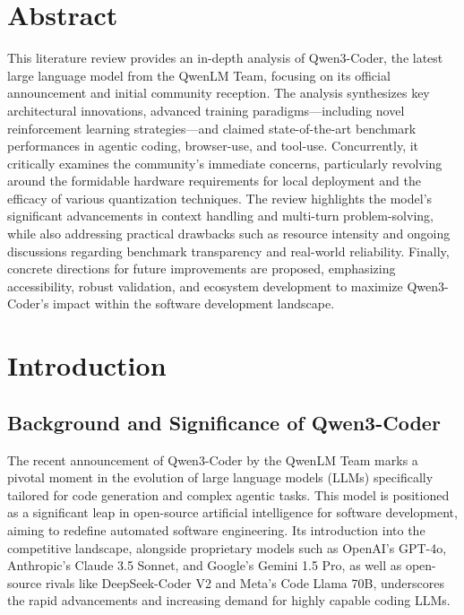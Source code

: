 




\section*{Abstract}

This literature review provides an in-depth analysis of Qwen3-Coder, the latest large language model from the QwenLM Team, focusing on its official announcement and initial community reception. The analysis synthesizes key architectural innovations, advanced training paradigms—including novel reinforcement learning strategies—and claimed state-of-the-art benchmark performances in agentic coding, browser-use, and tool-use. Concurrently, it critically examines the community's immediate concerns, particularly revolving around the formidable hardware requirements for local deployment and the efficacy of various quantization techniques. The review highlights the model's significant advancements in context handling and multi-turn problem-solving, while also addressing practical drawbacks such as resource intensity and ongoing discussions regarding benchmark transparency and real-world reliability. Finally, concrete directions for future improvements are proposed, emphasizing accessibility, robust validation, and ecosystem development to maximize Qwen3-Coder's impact within the software development landscape.

\section{Introduction}

\subsection{Background and Significance of Qwen3-Coder}

The recent announcement of Qwen3-Coder by the QwenLM Team marks a pivotal moment in the evolution of large language models (LLMs) specifically tailored for code generation and complex agentic tasks.\cite{fortuneindia_qwen3coder_2025, qwenlm_qwen3coder_blog_2025} This model is positioned as a significant leap in open-source artificial intelligence for software development, aiming to redefine automated software engineering.\cite{svenson_qwen3coder_medium_2025, apidog_qwen3coder_2025} Its introduction into the competitive landscape, alongside proprietary models such as OpenAI's GPT-4o, Anthropic's Claude 3.5 Sonnet, and Google's Gemini 1.5 Pro, as well as open-source rivals like DeepSeek-Coder V2 and Meta's Code Llama 70B, underscores the rapid advancements and increasing demand for highly capable coding LLMs.\cite{fortuneindia_qwen3coder_2025, llmstats_claude_qwen3_2025, entelligence_claude_deepseek_qwen_2025, gupta_qwen3coder_medium_2025, openrouter_qwen3coder_uptime_2025}

